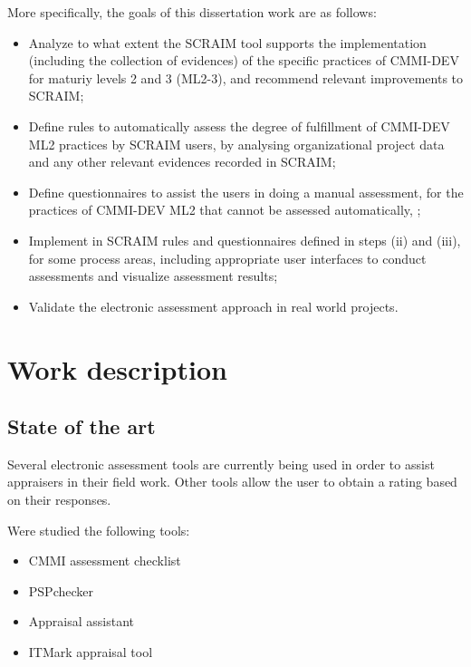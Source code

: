 \documentclass[9pt,a4paper]{extarticle}
\begin{document}
\begin{multicols}{2}
More specifically, the goals of this dissertation work are as follows:

\begin{itemize}%
	\item Analyze to what extent the SCRAIM tool supports the implementation (including the collection of evidences) of the specific practices of CMMI-DEV \cite{Development2010} for maturiy levels 2 and 3 (ML2-3), and recommend relevant improvements to SCRAIM;
	\item Define rules to automatically assess the degree of fulfillment of CMMI-DEV ML2 practices by SCRAIM users, by analysing organizational project data and any other relevant evidences recorded in SCRAIM;
	\item Define questionnaires to assist the users in doing a manual assessment, for the practices  of CMMI-DEV ML2 that cannot be assessed automatically, ;
	\item Implement in SCRAIM rules and questionnaires defined in steps (ii) and (iii), for some process areas, including appropriate user interfaces to conduct assessments and visualize assessment results;
	\item Validate the electronic assessment approach in real world projects.
\end{itemize}


\section{Work description}\label{sec:work}

\subsection{State of the art}

Several electronic assessment tools are currently being used in order to assist appraisers in their field work. Other tools allow the user to obtain a rating based on their responses.

Were studied the following tools:
\begin{itemize}
	\item CMMI assessment checklist \cite{capabilityassess}
	\item PSPchecker \cite{Pinto2010}
	\item Appraisal assistant \cite{Appraisal2015}
	\item ITMark appraisal tool ~\cite{ITMARKASSESSMENT}
\end{itemize}



\end{multicols}
\end{document}
